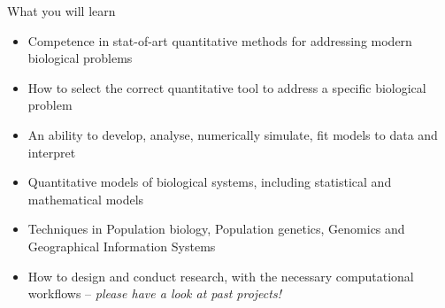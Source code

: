 \documentclass[xcolor={usenames,x11names},compress]{beamer}
\renewcommand{\(}{\begin{columns}}
\renewcommand{\)}{\end{columns}}
\newcommand{\<}[1]{\begin{column}{#1}}
\renewcommand{\>}{\end{column}}
\begin{document}
\begin{frame}{What you will learn}
  
  \begin{itemize}\setlength{\itemindent}{0em}\itemsep6pt
\item Competence in stat-of-art quantitative methods for addressing 
	modern biological problems
	
	\item How to select the correct quantitative tool to address a 
	specific biological problem

	\item An ability to develop, analyse, numerically simulate, fit 
	models to data and interpret

	\item Quantitative models of biological systems, including 
	statistical and mathematical models

 \item Techniques in Population biology, Population genetics, Genomics 
 and Geographical Information Systems

 \item How to design and conduct research, with the necessary 
 computational workflows -- {\it please have a look at past projects!}
 
 \end{itemize}  

  
\end{frame}
\end{document}
